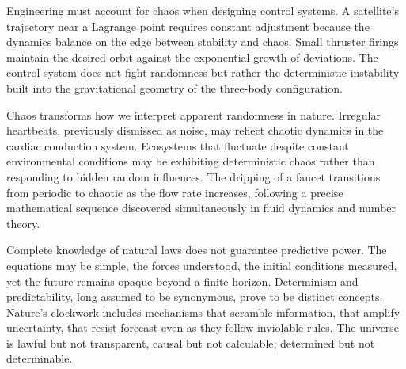 Engineering must account for chaos when designing control systems. A satellite's trajectory near a Lagrange point requires constant adjustment because the dynamics balance on the edge between stability and chaos. Small thruster firings maintain the desired orbit against the exponential growth of deviations. The control system does not fight randomness but rather the deterministic instability built into the gravitational geometry of the three-body configuration.

Chaos transforms how we interpret apparent randomness in nature. Irregular heartbeats, previously dismissed as noise, may reflect chaotic dynamics in the cardiac conduction system. Ecosystems that fluctuate despite constant environmental conditions may be exhibiting deterministic chaos rather than responding to hidden random influences. The dripping of a faucet transitions from periodic to chaotic as the flow rate increases, following a precise mathematical sequence discovered simultaneously in fluid dynamics and number theory.

Complete knowledge of natural laws does not guarantee predictive power. The equations may be simple, the forces understood, the initial conditions measured, yet the future remains opaque beyond a finite horizon. Determinism and predictability, long assumed to be synonymous, prove to be distinct concepts. Nature's clockwork includes mechanisms that scramble information, that amplify uncertainty, that resist forecast even as they follow inviolable rules. The universe is lawful but not transparent, causal but not calculable, determined but not determinable.
